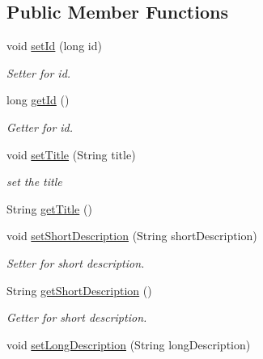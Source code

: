 \subsection*{Public Member Functions}
\begin{DoxyCompactItemize}
\item 
void \hyperlink{classuk_1_1ac_1_1swan_1_1digitaltrails_1_1components_1_1_description_a7f9a4f908fc75aaaef975d2d97b90d37}{set\+Id} (long id)
\begin{DoxyCompactList}\small\item\em Setter for id. \end{DoxyCompactList}\item 
long \hyperlink{classuk_1_1ac_1_1swan_1_1digitaltrails_1_1components_1_1_description_a9293240f3e8fef27692a4823684bf09a}{get\+Id} ()
\begin{DoxyCompactList}\small\item\em Getter for id. \end{DoxyCompactList}\item 
void \hyperlink{classuk_1_1ac_1_1swan_1_1digitaltrails_1_1components_1_1_description_a27276b955947915ec0f40bfeb3664bb2}{set\+Title} (String title)
\begin{DoxyCompactList}\small\item\em set the title \end{DoxyCompactList}\item 
String \hyperlink{classuk_1_1ac_1_1swan_1_1digitaltrails_1_1components_1_1_description_a321c7f52a328e8e7bc06dd71e6fc85c6}{get\+Title} ()
\item 
void \hyperlink{classuk_1_1ac_1_1swan_1_1digitaltrails_1_1components_1_1_description_ab8b346b8bbc12627664bdc2ae86758c0}{set\+Short\+Description} (String short\+Description)
\begin{DoxyCompactList}\small\item\em Setter for short description. \end{DoxyCompactList}\item 
String \hyperlink{classuk_1_1ac_1_1swan_1_1digitaltrails_1_1components_1_1_description_aaed5152012b15043c1edebf332269373}{get\+Short\+Description} ()
\begin{DoxyCompactList}\small\item\em Getter for short description. \end{DoxyCompactList}\item 
void \hyperlink{classuk_1_1ac_1_1swan_1_1digitaltrails_1_1components_1_1_description_a33956c99b3ee5ba289da4b33b061687c}{set\+Long\+Description} (String long\+Description)

\end{DoxyCompactItemize}
